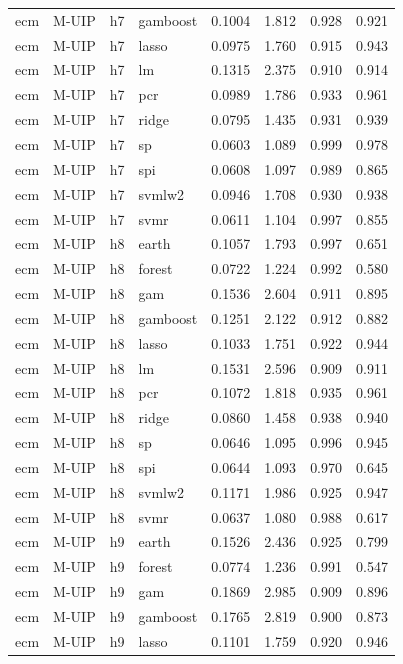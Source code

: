 \begin{ThreePartTable}
\begin{longtable}[t]{llclcccc}
ecm & M-UIP & h7 & gamboost & 0.1004 & 1.812 & 0.928 & 0.921\\
ecm & M-UIP & h7 & lasso & 0.0975 & 1.760 & 0.915 & 0.943\\
ecm & M-UIP & h7 & lm & 0.1315 & 2.375 & 0.910 & 0.914\\
ecm & M-UIP & h7 & pcr & 0.0989 & 1.786 & 0.933 & 0.961\\
ecm & M-UIP & h7 & ridge & 0.0795 & 1.435 & 0.931 & 0.939\\
ecm & M-UIP & h7 & sp & 0.0603 & 1.089 & 0.999 & 0.978\\
ecm & M-UIP & h7 & spi & 0.0608 & 1.097 & 0.989 & 0.865\\
ecm & M-UIP & h7 & svmlw2 & 0.0946 & 1.708 & 0.930 & 0.938\\
ecm & M-UIP & h7 & svmr & 0.0611 & 1.104 & 0.997 & 0.855\\
\addlinespace
ecm & M-UIP & h8 & earth & 0.1057 & 1.793 & 0.997 & 0.651\\
ecm & M-UIP & h8 & forest & 0.0722 & 1.224 & 0.992 & 0.580\\
ecm & M-UIP & h8 & gam & 0.1536 & 2.604 & 0.911 & 0.895\\
ecm & M-UIP & h8 & gamboost & 0.1251 & 2.122 & 0.912 & 0.882\\
ecm & M-UIP & h8 & lasso & 0.1033 & 1.751 & 0.922 & 0.944\\
ecm & M-UIP & h8 & lm & 0.1531 & 2.596 & 0.909 & 0.911\\
ecm & M-UIP & h8 & pcr & 0.1072 & 1.818 & 0.935 & 0.961\\
ecm & M-UIP & h8 & ridge & 0.0860 & 1.458 & 0.938 & 0.940\\
ecm & M-UIP & h8 & sp & 0.0646 & 1.095 & 0.996 & 0.945\\
ecm & M-UIP & h8 & spi & 0.0644 & 1.093 & 0.970 & 0.645\\
ecm & M-UIP & h8 & svmlw2 & 0.1171 & 1.986 & 0.925 & 0.947\\
ecm & M-UIP & h8 & svmr & 0.0637 & 1.080 & 0.988 & 0.617\\
\addlinespace
ecm & M-UIP & h9 & earth & 0.1526 & 2.436 & 0.925 & 0.799\\
ecm & M-UIP & h9 & forest & 0.0774 & 1.236 & 0.991 & 0.547\\
ecm & M-UIP & h9 & gam & 0.1869 & 2.985 & 0.909 & 0.896\\
ecm & M-UIP & h9 & gamboost & 0.1765 & 2.819 & 0.900 & 0.873\\
ecm & M-UIP & h9 & lasso & 0.1101 & 1.759 & 0.920 & 0.946\\

\end{longtable}
\end{ThreePartTable}

